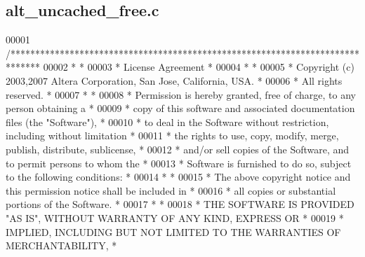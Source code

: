 \subsection{alt\+\_\+uncached\+\_\+free.\+c}
\label{alt__uncached__free_8c_source}

\begin{DoxyCode}
00001 \textcolor{comment}{/******************************************************************************}
00002 \textcolor{comment}{*                                                                             *}
00003 \textcolor{comment}{* License Agreement                                                           *}
00004 \textcolor{comment}{*                                                                             *}
00005 \textcolor{comment}{* Copyright (c) 2003,2007 Altera Corporation, San Jose, California, USA.      *}
00006 \textcolor{comment}{* All rights reserved.                                                        *}
00007 \textcolor{comment}{*                                                                             *}
00008 \textcolor{comment}{* Permission is hereby granted, free of charge, to any person obtaining a     *}
00009 \textcolor{comment}{* copy of this software and associated documentation files (the "Software"),  *}
00010 \textcolor{comment}{* to deal in the Software without restriction, including without limitation   *}
00011 \textcolor{comment}{* the rights to use, copy, modify, merge, publish, distribute, sublicense,    *}
00012 \textcolor{comment}{* and/or sell copies of the Software, and to permit persons to whom the       *}
00013 \textcolor{comment}{* Software is furnished to do so, subject to the following conditions:        *}
00014 \textcolor{comment}{*                                                                             *}
00015 \textcolor{comment}{* The above copyright notice and this permission notice shall be included in  *}
00016 \textcolor{comment}{* all copies or substantial portions of the Software.                         *}
00017 \textcolor{comment}{*                                                                             *}
00018 \textcolor{comment}{* THE SOFTWARE IS PROVIDED "AS IS", WITHOUT WARRANTY OF ANY KIND, EXPRESS OR  *}
00019 \textcolor{comment}{* IMPLIED, INCLUDING BUT NOT LIMITED TO THE WARRANTIES OF MERCHANTABILITY,    *}

\end{DoxyCode}

